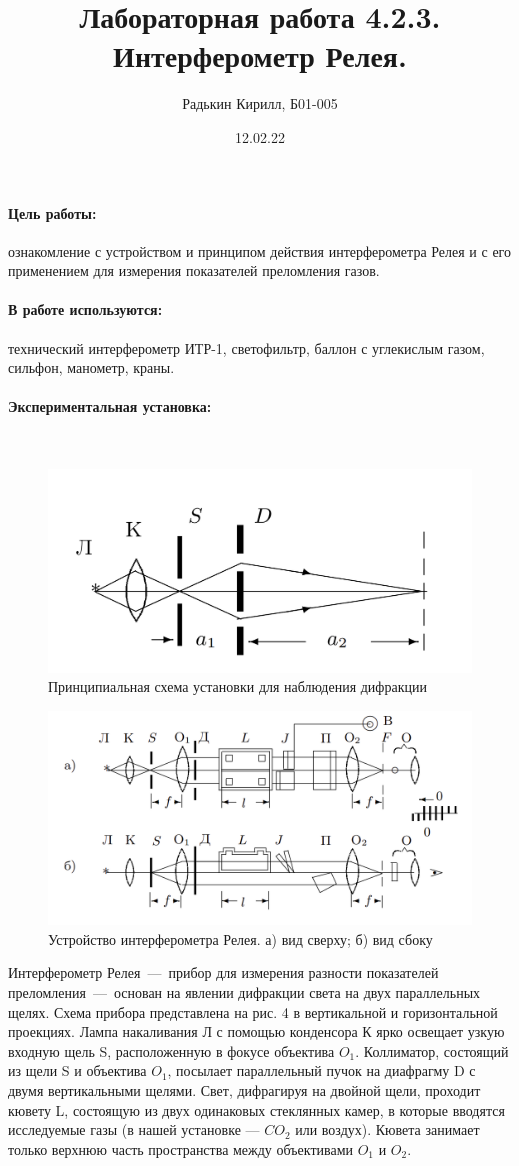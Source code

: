 \documentclass[a4paper, 12pt]{article}
\author{Радькин Кирилл, Б01-005}
\date{12.02.22}
\title{Лабораторная работа 4.2.3. Интерферометр Релея.}
\newcommand{\parag}[1]{\paragraph*{#1:}}
\begin{document}
\maketitle

\parag {Цель работы} ознакомление с устройством и принципом действия интерферометра Релея и с его применением для измерения показателей преломления газов.

\parag {В работе используются} технический интерферометр ИТР-1, светофильтр, баллон с углекислым газом, сильфон, манометр, краны.

\parag {Экспериментальная установка} ~

\begin{figure}[!h]
    \includegraphics[scale = 0.2]{Workplace.png}
    \centering
    \caption{Принципиальная схема установки для наблюдения дифракции}
    \label{workplace}
\end{figure}

\begin{figure}[!h]
    \includegraphics[scale = 0.2]{device.png}
    \centering
    \caption{Устройство интерферометра Релея. а) вид сверху; б) вид сбоку}
    \label{device}
\end{figure}

Интерферометр Релея~---~прибор для измерения разности показателей преломления~---~основан на явлении дифракции света на двух параллельных щелях. Схема прибора представлена на рис. 4 в вертикальной и горизонтальной проекциях. Лампа накаливания Л с помощью конденсора К ярко освещает узкую входную щель S, расположенную в фокусе объектива $O_1$. Коллиматор, состоящий из щели S и объектива $O_1$, посылает параллельный пучок на диафрагму D с двумя вертикальными щелями. Свет, дифрагируя на двойной щели, проходит кювету L, состоящую из двух одинаковых стеклянных камер, в которые вводятся исследуемые газы (в нашей установке — $CO_2$ или воздух). Кювета занимает только верхнюю часть пространства между объективами $O_1$ и $O_2$.
\end{document}
